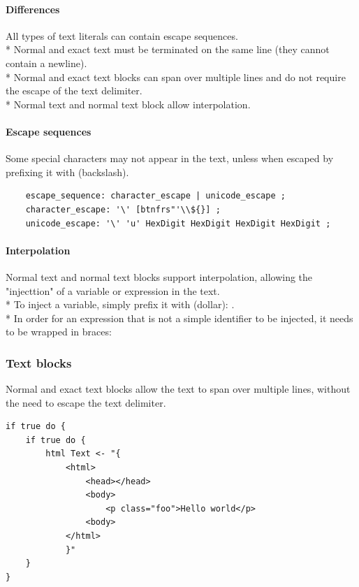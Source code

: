 \paragraph{Differences} All types of text literals can contain escape
sequences.\\*
Normal and exact text must be terminated on the same line (they cannot contain
a newline).\\*
Normal and exact text blocks can span over multiple lines and do not require
the escape of the text delimiter.\\*
Normal text and normal text block allow interpolation.

\paragraph{Escape sequences} Some special characters may not appear in the
text, unless when escaped by prefixing it with \code{$\backslash$} (backslash).

\begin{verbatim}
	escape_sequence: character_escape | unicode_escape ;
	character_escape: '\' [btnfrs"'\\${}] ;
	unicode_escape: '\' 'u' HexDigit HexDigit HexDigit HexDigit ;
\end{verbatim}

\paragraph{Interpolation} Normal text and normal text blocks support
interpolation, allowing the "injecttion" of a variable or expression in the
text.\\*
To inject a variable, simply prefix it with \code{\$} (dollar): .\\*
In order for an expression that is not a simple identifier to be injected, it
needs to be wrapped in braces: 

\subsubsection{Text blocks}

Normal and exact text blocks allow the text to span over multiple lines,
without the need to escape the text delimiter.

\begin{listing}
	\label{lst:textblock_example}
	\begin{verbatim}
if true do {
	if true do {
		html Text <- "{
			<html>
				<head></head>
				<body>
					<p class="foo">Hello world</p>
				<body>
			</html>
			}"
	}
}
	\end{verbatim}
	\caption{Example of a textblock appearing indented in a nested scope}
\end{listing}

